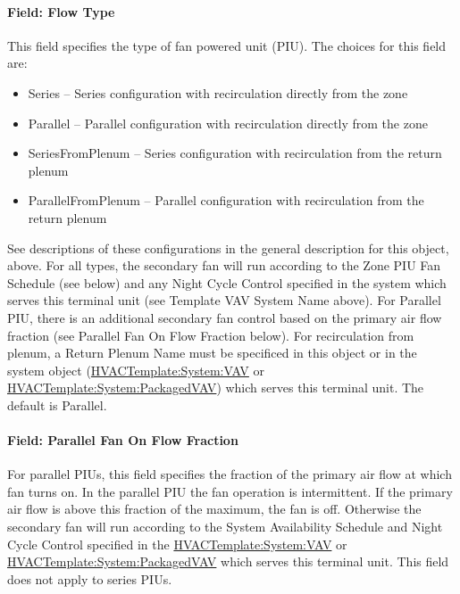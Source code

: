 \paragraph{Field: Flow Type}\label{field-flow-type}

This field specifies the type of fan powered unit (PIU). The choices for this field are:

\begin{itemize}
\item
  Series -- Series configuration with recirculation directly from the zone
\item
  Parallel -- Parallel configuration with recirculation directly from the zone
\item
  SeriesFromPlenum -- Series configuration with recirculation from the return plenum
\item
  ParallelFromPlenum -- Parallel configuration with recirculation from the return plenum
\end{itemize}

See descriptions of these configurations in the general description for this object, above. For all types, the secondary fan will run according to the Zone PIU Fan Schedule (see below) and any Night Cycle Control specified in the system which serves this terminal unit (see Template VAV System Name above). For Parallel PIU, there is an additional secondary fan control based on the primary air flow fraction (see Parallel Fan On Flow Fraction below). For recirculation from plenum, a Return Plenum Name must be specificed in this object or in the system object (\hyperref[hvactemplatesystemvav]{HVACTemplate:System:VAV} or \hyperref[hvactemplatesystempackagedvav]{HVACTemplate:System:PackagedVAV}) which serves this terminal unit. The default is Parallel.

\paragraph{Field: Parallel Fan On Flow Fraction}\label{field-parallel-fan-on-flow-fraction}

For parallel PIUs, this field specifies the fraction of the primary air flow at which fan turns on. In the parallel PIU the fan operation is intermittent. If the primary air flow is above this fraction of the maximum, the fan is off. Otherwise the secondary fan will run according to the System Availability Schedule and Night Cycle Control specified in the \hyperref[hvactemplatesystemvav]{HVACTemplate:System:VAV} or \hyperref[hvactemplatesystempackagedvav]{HVACTemplate:System:PackagedVAV} which serves this terminal unit. This field does not apply to series PIUs.

